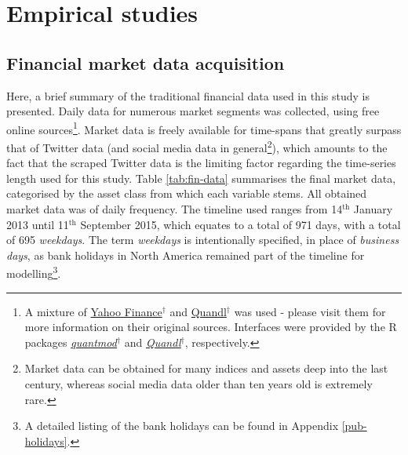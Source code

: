 \documentclass{article}
\begin{document}
\pagebreak

\pagebreak

\section{Empirical studies \label{chapter-empirical-studies}}
\label{sec-6}


\subsection{Financial market data acquisition}
\label{sec-6-1}

Here, a brief summary of the traditional financial data used in this study is presented. Daily data for numerous market segments was collected, using free online sources\footnote{A mixture of \href{http://finance.yahoo.com/}{Yahoo Finance$^{\dag{}}$} and \href{https://www.quandl.com/collections/markets}{Quandl$^{\dag{}}$} was used - please visit them for more information on their original sources. Interfaces were provided by the R packages \href{https://cran.r-project.org/web/packages/quantmod/index.html}{\emph{quantmod$^{\dag{}}$}} and \href{https://cran.r-project.org/web/packages/Quandl/index.html}{\emph{Quandl$^{\dag{}}$}}, respectively.}. Market data is freely available for time-spans that greatly surpass that of Twitter data (and social media data in general\footnote{Market data can be obtained for many indices and assets deep into the last century, whereas social media data older than ten years old is extremely rare.}), which amounts to the fact that the scraped Twitter data is the limiting factor regarding the time-series length used for this study. Table \ref{tab:fin-data} summarises the final market data, categorised by the asset class from which each variable stems. All obtained market data was of daily frequency. The timeline used ranges from 14$^{\text{th}}$ January 2013 until 11$^{\text{th}}$ September 2015, which equates to a total of 971 days, with a total of 695 \emph{weekdays}. The term \emph{weekdays} is intentionally specified, in place of \emph{business days}, as bank holidays in North America remained part of the timeline for modelling\footnote{A detailed listing of the bank holidays can be found in Appendix \ref{pub-holidays}.}.
\end{document}
